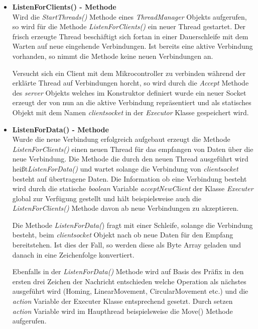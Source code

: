 \begin{itemize}
\item \textbf{ListenForClients() - Methode}\\
Wird die \textit{StartThreads()} Methode eines \textit{ThreadManager} Objekts aufgerufen, so wird für die Methode \textit{ListenForClients()} ein neuer Thread gestartet. Der frisch erzeugte Thread beschäftigt sich fortan in einer Dauerschleife mit dem Warten auf neue eingehende Verbindungen. Ist bereits eine aktive Verbindung vorhanden, so nimmt die Methode keine neuen Verbindungen an.

Versucht sich ein Client mit dem Mikrocontroller zu verbinden während der erklärte Thread auf Verbindungen horcht, so wird durch die \textit{Accept} Methode des \textit{server} Objekts welches im Konstruktor definiert wurde ein neuer Socket erzeugt der von nun an die aktive Verbindung repräsentiert und als statisches Objekt mit dem Namen \textit{clientsocket} in der \textit{Executor} Klasse gespeichert wird.

\item \textbf{ListenForData() - Methode}\\
Wurde die neue Verbindung erfolgreich aufgebaut erzeugt die Methode \textit{ListenForClients()} einen neuen Thread für das empfangen von Daten über die neue Verbindung. Die Methode die durch den neuen Thread ausgeführt wird heißt\textit{ListenForData()} und wartet solange die Verbindung von \textit{clientsocket} besteht auf übertragene Daten. 
Die Information ob eine Verbindung besteht wird durch die statische \textit{boolean} Variable \textit{acceptNewClient} der Klasse \textit{Executer} global zur Verfügung gestellt und hält beispielsweise auch die \textit{ListenForClients()} Methode davon ab neue Verbindungen zu akzeptieren.

Die Methode \textit{ListenForData(}) fragt mit einer Schleife, solange die Verbindung besteht, beim  \textit{clientsocket} Objekt nach ob neue Daten für den Empfang bereitstehen. Ist dies der Fall, so werden diese als Byte Array geladen und danach in eine Zeichenfolge konvertiert.

Ebenfalls in der \textit{ListenForData()} Methode wird auf Basis des Präfix in den ersten drei Zeichen der Nachricht entschieden welche Operation als nächstes ausgeführt wird (Homing, LinearMovement, CircularMovement etc.) und die \textit{action} Variable der Executer Klasse entsprechend gesetzt. Durch setzen \textit{action} Variable wird im Haupthread beispielsweise die Move() Methode aufgerufen.


\end{itemize}
